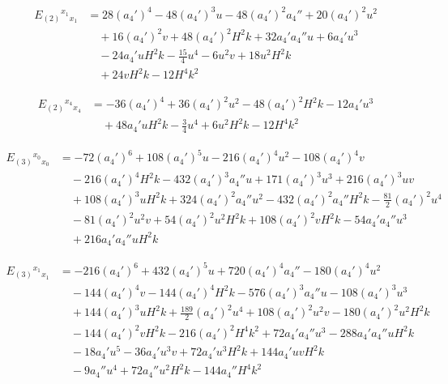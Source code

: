 \documentclass[11pt]{article}
\begin{document}
\[
\begin{aligned}
E_{(2)}{}^{x_1}{}_{x_1} &= 28 (a_4')^{4} - 48 (a_4')^{3} u - 48 (a_4')^{2} a_4'' + 20 (a_4')^{2} u^{2} \\
&\quad + 16 (a_4')^{2} v + 48 (a_4')^{2} H^{2} k + 32 a_4' a_4'' u + 6 a_4' u^{3} \\
&\quad - 24 a_4' u H^{2} k - \tfrac{15}{4} u^{4} - 6 u^{2} v + 18 u^{2} H^{2} k \\
&\quad + 24 v H^{2} k - 12 H^{4} k^{2}
\end{aligned}
\]

\[
\begin{aligned}
E_{(2)}{}^{x_4}{}_{x_4} &= -36 (a_4')^{4} + 36 (a_4')^{2} u^{2} - 48 (a_4')^{2} H^{2} k - 12 a_4' u^{3} \\
&\quad + 48 a_4' u H^{2} k - \tfrac{3}{4} u^{4} + 6 u^{2} H^{2} k - 12 H^{4} k^{2}
\end{aligned}
\]

\[
\begin{aligned}
E_{(3)}{}^{x_0}{}_{x_0} &= -72 (a_4')^{6} + 108 (a_4')^{5} u - 216 (a_4')^{4} u^{2} - 108 (a_4')^{4} v \\
&\quad - 216 (a_4')^{4} H^{2} k - 432 (a_4')^{3} a_4'' u + 171 (a_4')^{3} u^{3} + 216 (a_4')^{3} u v \\
&\quad + 108 (a_4')^{3} u H^{2} k + 324 (a_4')^{2} a_4'' u^{2} - 432 (a_4')^{2} a_4'' H^{2} k - \tfrac{81}{2} (a_4')^{2} u^{4} \\
&\quad - 81 (a_4')^{2} u^{2} v + 54 (a_4')^{2} u^{2} H^{2} k + 108 (a_4')^{2} v H^{2} k - 54 a_4' a_4'' u^{3} \\
&\quad + 216 a_4' a_4'' u H^{2} k
\end{aligned}
\]

\[
\begin{aligned}
E_{(3)}{}^{x_1}{}_{x_1} &= -216 (a_4')^{6} + 432 (a_4')^{5} u + 720 (a_4')^{4} a_4'' - 180 (a_4')^{4} u^{2} \\
&\quad - 144 (a_4')^{4} v - 144 (a_4')^{4} H^{2} k - 576 (a_4')^{3} a_4'' u - 108 (a_4')^{3} u^{3} \\
&\quad + 144 (a_4')^{3} u H^{2} k + \tfrac{189}{2} (a_4')^{2} u^{4} + 108 (a_4')^{2} u^{2} v - 180 (a_4')^{2} u^{2} H^{2} k \\
&\quad - 144 (a_4')^{2} v H^{2} k - 216 (a_4')^{2} H^{4} k^{2} + 72 a_4' a_4'' u^{3} - 288 a_4' a_4'' u H^{2} k \\
&\quad - 18 a_4' u^{5} - 36 a_4' u^{3} v + 72 a_4' u^{3} H^{2} k + 144 a_4' u v H^{2} k \\
&\quad - 9 a_4'' u^{4} + 72 a_4'' u^{2} H^{2} k - 144 a_4'' H^{4} k^{2}
\end{aligned}
\]
\end{document}
